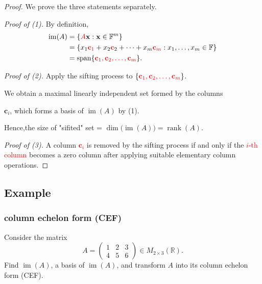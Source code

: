 \documentclass[12pt]{article}
\begin{document}
\begin{proof}
We prove the three statements separately.

\medskip
\noindent
\textit{Proof of (1).}
By definition,
\begin{align*}
\operatorname{im}(A)
&=
\left\{
\textcolor{red}{A}\mathbf{x}:\mathbf{x}\in\mathbb{F}^m
\right\} \\
&=
\left\{
x_1\textcolor{red}{\mathbf{c}_1}+x_2\textcolor{red}{\mathbf{c}}_2+\cdots+x_m\textcolor{red}{\mathbf{c}_m}
:x_1,\ldots,x_m\in\mathbb{F}
\right\} \\
&=
\operatorname{span}
\{\textcolor{red}{\mathbf{c}_1,\mathbf{c}_2,\ldots,\mathbf{c}_m}\}.
\end{align*}

\medskip

\noindent

\textit{Proof of (2).}
Apply the sifting process to $\{\textcolor{red}{\mathbf{c}_1,\mathbf{c}_2,\ldots,\mathbf{c}_m}\}$.

We obtain a maximal linearly independent set formed by the columns

$\mathbf{c}_i$, which forms a basis of $\operatorname{im}(A)$ by (1).

Hence,the size of "sifited" set = $\dim\bigl(\operatorname{im}(A)\bigr)=\operatorname{rank}(A)$.

\medskip
\noindent
\textit{Proof of (3).}
A column \textcolor{red}{$\mathbf{c}_i$} is removed by the sifting process if and only if
the \textcolor{red}{$i$-th column} becomes a zero column after applying suitable elementary
column operations.

\end{proof}

\subsection{Example}

\subsubsection{column echelon form (CEF)}
Consider the matrix
\[
A=
\begin{pmatrix}
1&2&3\\
4&5&6
\end{pmatrix}
\in M_{2\times 3}(\mathbb{R}).
\]
Find $\operatorname{im}(A)$, a basis of $\operatorname{im}(A)$, and transform
$A$ into its column echelon form (CEF).
\end{document}
